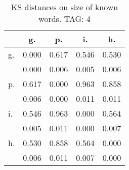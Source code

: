 \begin{table}[h!]
\begin{center}
\begin{tabular}{| l | c | c | c | c |}\hline
 & g. & p. & i. & h. \\\hline
g. & 0.000  & 0.617  & 0.546  & 0.530 \\\hline
 & 0.000  & 0.006  & 0.005  & 0.006 \\\hline
p. & 0.617  & 0.000  & 0.963  & 0.858 \\\hline
 & 0.006  & 0.000  & 0.011  & 0.011 \\\hline
i. & 0.546  & 0.963  & 0.000  & 0.564 \\\hline
 & 0.005  & 0.011  & 0.000  & 0.007 \\\hline
h. & 0.530  & 0.858  & 0.564  & 0.000 \\\hline
 & 0.006  & 0.011  & 0.007  & 0.000 \\\hline
\end{tabular}
\caption{KS distances on size of known words. TAG: 4}
\end{center}
\end{table}